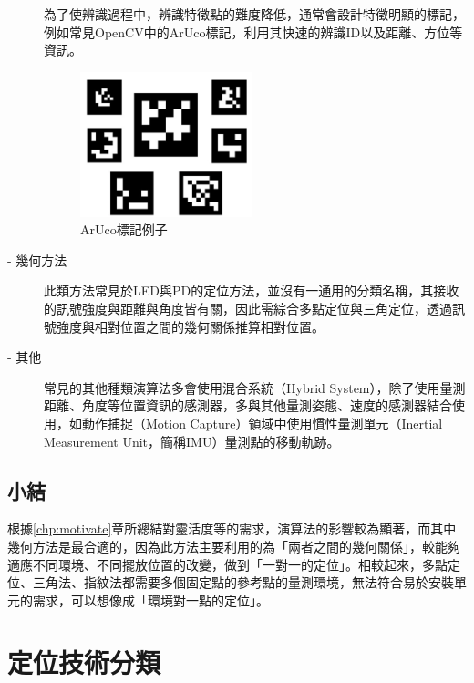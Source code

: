 \begin{description}
        \qquad
        為了使辨識過程中，辨識特徵點的難度降低，通常會設計特徵明顯的標記，例如常見OpenCV中的ArUco標記，利用其快速的辨識ID以及距離、方位等資訊。
        
        \begin{figure}[h]
            \centering
            \includegraphics[width=5cm]{ch2pic/aruco.png}
            \caption{ArUco標記例子\cite{pic:aruco}}
            \label{pic:aruco}
        \end{figure}
        
        \item[- 幾何方法] \hfill 
        
        \qquad
        此類方法常見於LED與PD的定位方法，並沒有一通用的分類名稱，其接收的訊號強度與距離與角度皆有關，因此需綜合多點定位與三角定位，透過訊號強度與相對位置之間的幾何關係推算相對位置\cite{survey_light2020}。
        
        \item[- 其他]\hfill 
        
        \qquad
        常見的其他種類演算法多會使用混合系統（Hybrid System）\cite{survey_indoor2018}，除了使用量測距離、角度等位置資訊的感測器，多與其他量測姿態、速度的感測器結合使用，如動作捕捉（Motion Capture）領域中使用慣性量測單元（Inertial Measurement Unit，簡稱IMU）量測點的移動軌跡。

    \end{description}

    \subsection{小結}

    根據\ref{chp:motivate}章所總結對靈活度等的需求，演算法的影響較為顯著，而其中幾何方法是最合適的，因為此方法主要利用的為「兩者之間的幾何關係」，較能夠適應不同環境、不同擺放位置的改變，做到「一對一的定位」。相較起來，多點定位、三角法、指紋法都需要多個固定點的參考點的量測環境，無法符合易於安裝單元的需求，可以想像成「環境對一點的定位」。



\section{定位技術分類}
\label{chp:technique}


